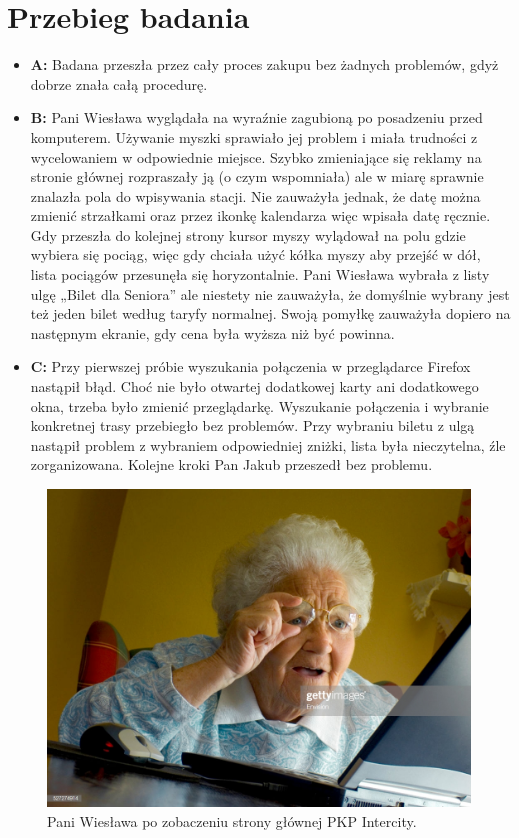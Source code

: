 \documentclass[12pt, a4paper, oneside]{report}
\begin{document}
\section*{Przebieg badania}

\begin{itemize}
    \item \textbf{A:} Badana przeszła przez cały proces zakupu bez żadnych 
    problemów, gdyż dobrze znała całą procedurę. 
    \item \textbf{B:} Pani Wiesława wyglądała na wyraźnie zagubioną po 
    posadzeniu przed komputerem. Używanie myszki sprawiało jej problem i miała 
    trudności z wycelowaniem w odpowiednie miejsce. Szybko zmieniające się 
    reklamy na stronie głównej rozpraszały ją (o czym wspomniała) ale w miarę 
    sprawnie znalazła pola do wpisywania stacji. Nie zauważyła jednak, że datę 
    można zmienić strzałkami oraz przez ikonkę kalendarza więc wpisała datę 
    ręcznie. Gdy przeszła do kolejnej strony kursor myszy wylądował na polu 
    gdzie wybiera się pociąg, więc gdy chciała użyć kółka myszy aby przejść w 
    dół, lista pociągów przesunęła się horyzontalnie. Pani Wiesława wybrała z 
    listy ulgę „Bilet dla Seniora” ale niestety nie zauważyła, że domyślnie 
    wybrany jest też jeden bilet według taryfy normalnej. Swoją pomyłkę
    zauważyła dopiero na następnym ekranie, gdy cena była wyższa niż być powinna.
    \item \textbf{C:}  Przy pierwszej próbie wyszukania połączenia w 
    przeglądarce Firefox nastąpił błąd. Choć nie było otwartej dodatkowej karty 
    ani dodatkowego okna, trzeba było zmienić przeglądarkę. Wyszukanie 
    połączenia i wybranie konkretnej trasy przebiegło bez problemów. Przy 
    wybraniu biletu z ulgą nastąpił problem z wybraniem odpowiedniej zniżki, 
    lista była nieczytelna, źle zorganizowana. Kolejne kroki Pan Jakub 
    przeszedł bez problemu.
\end{itemize}

\begin{figure}[]
    \centering
    \includegraphics[scale=0.30]{./pani-wieslawa.png}
    \caption{Pani Wiesława po zobaczeniu strony głównej PKP Intercity.}
    \label{}
\end{figure}
\end{document}
